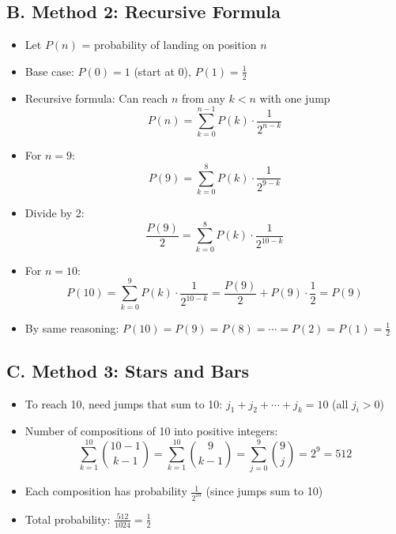 \documentclass[11pt]{article}
\begin{document}
\begin{conversionbox}
\subsection*{B. Method 2: Recursive Formula}
\begin{itemize}[leftmargin=*]
    \item Let $P(n)$ = probability of landing on position $n$
    \item Base case: $P(0) = 1$ (start at 0), $P(1) = \frac{1}{2}$
    \item Recursive formula: Can reach $n$ from any $k < n$ with one jump
    \[P(n) = \sum_{k=0}^{n-1} P(k) \cdot \frac{1}{2^{n-k}}\]
    \item For $n = 9$:
    \[P(9) = \sum_{k=0}^{8} P(k) \cdot \frac{1}{2^{9-k}}\]
    \item Divide by 2:
    \[\frac{P(9)}{2} = \sum_{k=0}^{8} P(k) \cdot \frac{1}{2^{10-k}}\]
    \item For $n = 10$:
    \[P(10) = \sum_{k=0}^{9} P(k) \cdot \frac{1}{2^{10-k}} = \frac{P(9)}{2} + P(9) \cdot \frac{1}{2} = P(9)\]
    \item By same reasoning: $P(10) = P(9) = P(8) = \cdots = P(2) = P(1) = \frac{1}{2}$
\end{itemize}

\subsection*{C. Method 3: Stars and Bars}
\begin{itemize}[leftmargin=*]
    \item To reach 10, need jumps that sum to 10: $j_1 + j_2 + \cdots + j_k = 10$ (all $j_i > 0$)
    \item Number of compositions of 10 into positive integers:
    \[\sum_{k=1}^{10} \binom{10-1}{k-1} = \sum_{k=1}^{10} \binom{9}{k-1} = \sum_{j=0}^{9} \binom{9}{j} = 2^9 = 512\]
    \item Each composition has probability $\frac{1}{2^{10}}$ (since jumps sum to 10)
    \item Total probability: $\frac{512}{1024} = \frac{1}{2}$
\end{itemize}


\end{conversionbox}
\end{document}
